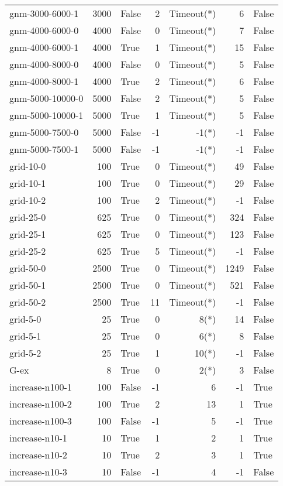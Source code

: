 \begin{longtable}{lrlrrrl}
gnm-3000-6000-1 & 3000 & False & 2 & Timeout(*) & 6 & False \\
gnm-4000-6000-0 & 4000 & False & 0 & Timeout(*) & 7 & False \\
gnm-4000-6000-1 & 4000 & True & 1 & Timeout(*) & 15 & False \\
gnm-4000-8000-0 & 4000 & False & 0 & Timeout(*) & 5 & False \\
gnm-4000-8000-1 & 4000 & True & 2 & Timeout(*) & 6 & False \\
gnm-5000-10000-0 & 5000 & False & 2 & Timeout(*) & 5 & False \\
gnm-5000-10000-1 & 5000 & True & 1 & Timeout(*) & 5 & False \\
gnm-5000-7500-0 & 5000 & False & -1 & -1(*) & -1 & False \\
gnm-5000-7500-1 & 5000 & False & -1 & -1(*) & -1 & False \\
grid-10-0 & 100 & True & 0 & Timeout(*) & 49 & False \\
grid-10-1 & 100 & True & 0 & Timeout(*) & 29 & False \\
grid-10-2 & 100 & True & 2 & Timeout(*) & -1 & False \\
grid-25-0 & 625 & True & 0 & Timeout(*) & 324 & False \\
grid-25-1 & 625 & True & 0 & Timeout(*) & 123 & False \\
grid-25-2 & 625 & True & 5 & Timeout(*) & -1 & False \\
grid-50-0 & 2500 & True & 0 & Timeout(*) & 1249 & False \\
grid-50-1 & 2500 & True & 0 & Timeout(*) & 521 & False \\
grid-50-2 & 2500 & True & 11 & Timeout(*) & -1 & False \\
grid-5-0 & 25 & True & 0 & 8(*) & 14 & False \\
grid-5-1 & 25 & True & 0 & 6(*) & 8 & False \\
grid-5-2 & 25 & True & 1 & 10(*) & -1 & False \\
G-ex & 8 & True & 0 & 2(*) & 3 & False \\
increase-n100-1 & 100 & False & -1 & 6 & -1 & True \\
increase-n100-2 & 100 & True & 2 & 13 & 1 & True \\
increase-n100-3 & 100 & False & -1 & 5 & -1 & True \\
increase-n10-1 & 10 & True & 1 & 2 & 1 & True \\
increase-n10-2 & 10 & True & 2 & 3 & 1 & True \\
increase-n10-3 & 10 & False & -1 & 4 & -1 & False \\

\end{longtable}

